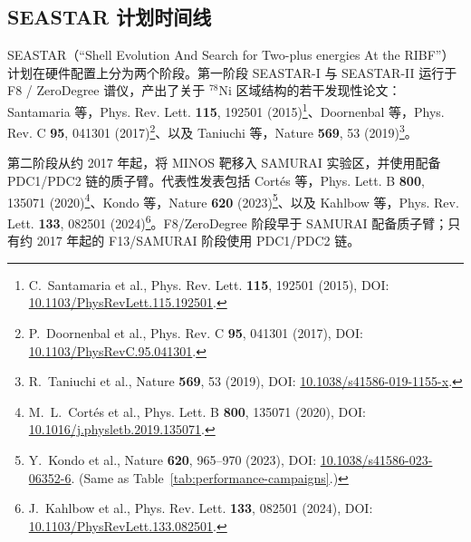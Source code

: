 \documentclass[a4paper, 11pt]{article}
\begin{document}
\subsection{SEASTAR 计划时间线}
SEASTAR（``Shell Evolution And Search for Two-plus energies At the RIBF''）计划在硬件配置上分为两个阶段。第一阶段 SEASTAR-I 与 SEASTAR-II 运行于 F8 / ZeroDegree 谱仪，产出了关于 $^{78}$Ni 区域结构的若干发现性论文：Santamaria 等，Phys. Rev. Lett. \textbf{115}, 192501 (2015)\footnote{\label{fn:santamaria2015prl}C.~Santamaria et al., Phys. Rev. Lett. \textbf{115}, 192501 (2015), DOI: \href{https://doi.org/10.1103/PhysRevLett.115.192501}{10.1103/PhysRevLett.115.192501}.}、Doornenbal 等，Phys. Rev. C \textbf{95}, 041301 (2017)\footnote{\label{fn:doornenbal2017}P.~Doornenbal et al., Phys. Rev. C \textbf{95}, 041301 (2017), DOI: \href{https://doi.org/10.1103/PhysRevC.95.041301}{10.1103/PhysRevC.95.041301}.}、以及 Taniuchi 等，Nature \textbf{569}, 53 (2019)\footnote{\label{fn:taniuchi2019}R.~Taniuchi et al., Nature \textbf{569}, 53 (2019), DOI: \href{https://doi.org/10.1038/s41586-019-1155-x}{10.1038/s41586-019-1155-x}.}。

第二阶段从约 2017 年起，将 MINOS 靶移入 SAMURAI 实验区，并使用配备 PDC1/PDC2 链的质子臂。代表性发表包括 Cortés 等，Phys. Lett. B \textbf{800}, 135071 (2020)\footnote{\label{fn:cortes2020}M.~L.~Cortés et al., Phys. Lett. B \textbf{800}, 135071 (2020), DOI: \href{https://doi.org/10.1016/j.physletb.2019.135071}{10.1016/j.physletb.2019.135071}.}、Kondo 等，Nature \textbf{620} (2023)\footnote{\label{fn:kondo2023ref}Y.~Kondo et al., Nature \textbf{620}, 965--970 (2023), DOI: \href{https://doi.org/10.1038/s41586-023-06352-6}{10.1038/s41586-023-06352-6}. (Same as Table~\ref{tab:performance-campaigns}.)}、以及 Kahlbow 等，Phys. Rev. Lett. \textbf{133}, 082501 (2024)\footnote{\label{fn:kahlbow2024prlref}J.~Kahlbow et al., Phys. Rev. Lett. \textbf{133}, 082501 (2024), DOI: \href{https://doi.org/10.1103/PhysRevLett.133.082501}{10.1103/PhysRevLett.133.082501}.}。F8/ZeroDegree 阶段早于 SAMURAI 配备质子臂；只有约 2017 年起的 F13/SAMURAI 阶段使用 PDC1/PDC2 链。
\end{document}
